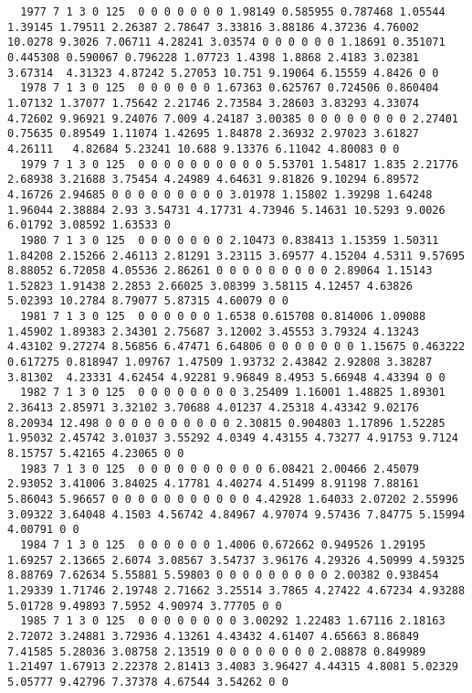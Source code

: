 \begin{landscape}
{\begin{verbatim}
  1977 7 1 3 0 125  0 0 0 0 0 0 0 1.98149 0.585955 0.787468 1.05544 1.39145 1.79511 2.26387 2.78647 3.33816 3.88186 4.37236 4.76002 10.0278 9.3026 7.06711 4.28241 3.03574 0 0 0 0 0 0 1.18691 0.351071 0.445308 0.590067 0.796228 1.07723 1.4398 1.8868 2.4183 3.02381 3.67314  4.31323 4.87242 5.27053 10.751 9.19064 6.15559 4.8426 0 0
  1978 7 1 3 0 125  0 0 0 0 0 0 1.67363 0.625767 0.724506 0.860404 1.07132 1.37077 1.75642 2.21746 2.73584 3.28603 3.83293 4.33074 4.72602 9.96921 9.24076 7.009 4.24187 3.00385 0 0 0 0 0 0 0 0 2.27401 0.75635 0.89549 1.11074 1.42695 1.84878 2.36932 2.97023 3.61827 4.26111   4.82684 5.23241 10.688 9.13376 6.11042 4.80083 0 0
  1979 7 1 3 0 125  0 0 0 0 0 0 0 0 0 0 5.53701 1.54817 1.835 2.21776 2.68938 3.21688 3.75454 4.24989 4.64631 9.81826 9.10294 6.89572 4.16726 2.94685 0 0 0 0 0 0 0 0 0 3.01978 1.15802 1.39298 1.64248 1.96044 2.38884 2.93 3.54731 4.17731 4.73946 5.14631 10.5293 9.0026  6.01792 3.08592 1.63533 0
  1980 7 1 3 0 125  0 0 0 0 0 0 0 2.10473 0.838413 1.15359 1.50311 1.84208 2.15266 2.46113 2.81291 3.23115 3.69577 4.15204 4.5311 9.57695 8.88052 6.72058 4.05536 2.86261 0 0 0 0 0 0 0 0 0 2.89064 1.15143 1.52823 1.91438 2.2853 2.66025 3.08399 3.58115 4.12457 4.63826   5.02393 10.2784 8.79077 5.87315 4.60079 0 0
  1981 7 1 3 0 125  0 0 0 0 0 0 1.6538 0.615708 0.814006 1.09088 1.45902 1.89383 2.34301 2.75687 3.12002 3.45553 3.79324 4.13243 4.43102 9.27274 8.56856 6.47471 6.64806 0 0 0 0 0 0 0 1.15675 0.463222 0.617275 0.818947 1.09767 1.47509 1.93732 2.43842 2.92808 3.38287 3.81302  4.23331 4.62454 4.92281 9.96849 8.4953 5.66948 4.43394 0 0
  1982 7 1 3 0 125  0 0 0 0 0 0 0 0 3.25409 1.16001 1.48825 1.89301 2.36413 2.85971 3.32102 3.70688 4.01237 4.25318 4.43342 9.02176 8.20934 12.498 0 0 0 0 0 0 0 0 0 0 2.30815 0.904803 1.17896 1.52285 1.95032 2.45742 3.01037 3.55292 4.0349 4.43155 4.73277 4.91753 9.7124  8.15757 5.42165 4.23065 0 0
  1983 7 1 3 0 125  0 0 0 0 0 0 0 0 0 0 6.08421 2.00466 2.45079 2.93052 3.41006 3.84025 4.17781 4.40274 4.51499 8.91198 7.88161 5.86043 5.96657 0 0 0 0 0 0 0 0 0 0 0 4.42928 1.64033 2.07202 2.55996 3.09322 3.64048 4.1503 4.56742 4.84967 4.97074 9.57436 7.84775 5.15994   4.00791 0 0
  1984 7 1 3 0 125  0 0 0 0 0 0 1.4006 0.672662 0.949526 1.29195 1.69257 2.13665 2.6074 3.08567 3.54737 3.96176 4.29326 4.50999 4.59325 8.88769 7.62634 5.55881 5.59803 0 0 0 0 0 0 0 0 0 2.00382 0.938454 1.29339 1.71746 2.19748 2.71662 3.25514 3.7865 4.27422 4.67234 4.93288  5.01728 9.49893 7.5952 4.90974 3.77705 0 0
  1985 7 1 3 0 125  0 0 0 0 0 0 0 0 3.00292 1.22483 1.67116 2.18163 2.72072 3.24881 3.72936 4.13261 4.43432 4.61407 4.65663 8.86849 7.41585 5.28036 3.08758 2.13519 0 0 0 0 0 0 0 0 2.08878 0.849989 1.21497 1.67913 2.22378 2.81413 3.4083 3.96427 4.44315 4.8081 5.02329   5.05777 9.42796 7.37378 4.67544 3.54262 0 0

\end{verbatim}}
\end{landscape}
